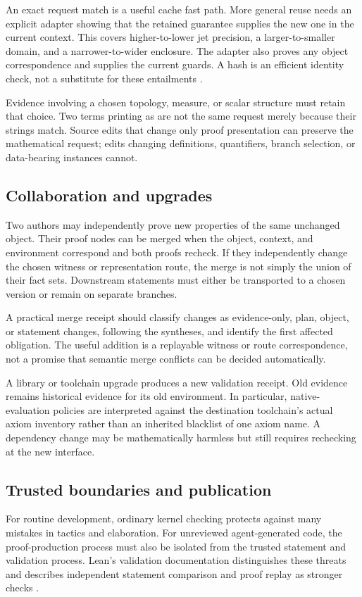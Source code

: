 \documentclass[11pt,a4paper]{article}
\newcommand{\code}[1]{\texttt{\detokenize{#1}}}
\theoremstyle{plain}\newtheorem{proposition}{Proposition}[section]
\theoremstyle{definition}\newtheorem{definition}[proposition]{Definition}
\theoremstyle{remark}\newtheorem{remark}[proposition]{Remark}
\begin{document}
An exact request match is a useful cache fast path. More general reuse needs an explicit adapter showing that the retained guarantee supplies the new one in the current context. This covers higher-to-lower jet precision, a larger-to-smaller domain, and a narrower-to-wider enclosure. The adapter also proves any object correspondence and supplies the current guards. A hash is an efficient identity check, not a substitute for these entailments \cite{synA}.

Evidence involving a chosen topology, measure, or scalar structure must retain that choice. Two terms printing as \code{f} are not the same request merely because their strings match. Source edits that change only proof presentation can preserve the mathematical request; edits changing definitions, quantifiers, branch selection, or data-bearing instances cannot.

\subsection{Collaboration and upgrades}
Two authors may independently prove new properties of the same unchanged object. Their proof nodes can be merged when the object, context, and environment correspond and both proofs recheck. If they independently change the chosen witness or representation route, the merge is not simply the union of their fact sets. Downstream statements must either be transported to a chosen version or remain on separate branches.

A practical merge receipt should classify changes as evidence-only, plan, object, or statement changes, following the syntheses, and identify the first affected obligation. The useful addition is a replayable witness or route correspondence, not a promise that semantic merge conflicts can be decided automatically.

A library or toolchain upgrade produces a new validation receipt. Old evidence remains historical evidence for its old environment. In particular, native-evaluation policies are interpreted against the destination toolchain's actual axiom inventory rather than an inherited blacklist of one axiom name. A dependency change may be mathematically harmless but still requires rechecking at the new interface.

\subsection{Trusted boundaries and publication}
For routine development, ordinary kernel checking protects against many mistakes in tactics and elaboration. For unreviewed agent-generated code, the proof-production process must also be isolated from the trusted statement and validation process. Lean's validation documentation distinguishes these threats and describes independent statement comparison and proof replay as stronger checks \cite{validation}.
\end{document}
